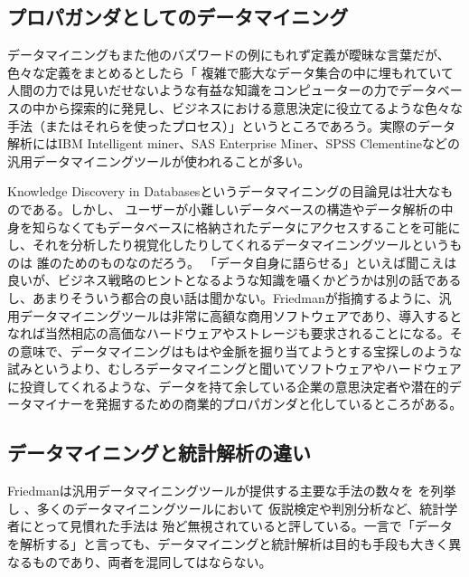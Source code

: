\subsection{プロパガンダとしてのデータマイニング}
データマイニングもまた他のバズワードの例にもれず定義が曖昧な言葉だが、色々な定義をまとめるとしたら「
複雑で膨大なデータ集合の中に埋もれていて人間の力では見いだせないような有益な知識をコンピューターの力でデータベースの中から探索的に発見し、ビジネスにおける意思決定に役立てるような色々な手法（またはそれらを使ったプロセス）」というところであろう。実際のデータ解析にはIBM Intelligent miner、SAS Enterprise Miner、SPSS Clementineなどの汎用データマイニングツールが使われることが多い。

Knowledge Discovery in Databasesというデータマイニングの目論見は壮大なものである。しかし、
ユーザーが小難しいデータベースの構造やデータ解析の中身を知らなくてもデータベースに格納されたデータにアクセスすることを可能にし、それを分析したり視覚化したりしてくれるデータマイニングツールというものは
誰のためのものなのだろう。
「データ自身に語らせる」といえば聞こえは良いが、ビジネス戦略のヒントとなるような知識を囁くかどうかは別の話であるし、あまりそういう都合の良い話は聞かない。Friedmanが指摘するように、汎用データマイニングツールは非常に高額な商用ソフトウェアであり、導入するとなれば当然相応の高価なハードウェアやストレージも要求されることになる。その意味で、データマイニングはもはや金脈を掘り当てようとする宝探しのような試みというより、むしろデータマイニングと聞いてソフトウェアやハードウェアに投資してくれるような、データを持て余している企業の意思決定者や潜在的データマイナーを発掘するための商業的プロパガンダと化しているところがある。

\subsection{データマイニングと統計解析の違い}
Friedmanは汎用データマイニングツールが提供する主要な手法の数々を
を列挙し
、多くのデータマイニングツールにおいて
仮説検定や判別分析など、統計学者にとって見慣れた手法は
殆ど無視されていると評している。一言で「データを解析する」と言っても、データマイニングと統計解析は目的も手段も大きく異なるものであり、両者を混同してはならない。

